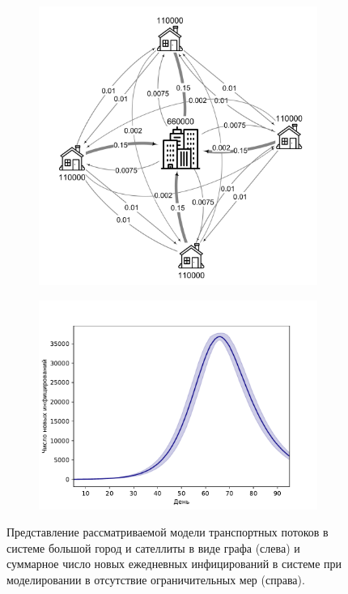 \documentclass[a4paper,12pt]{article} %
\begin{document}
\begin{figure}[H]
    \centering
    \begin{subfigure}{0.45\linewidth}
        \centering
        \includegraphics[width=\linewidth]{images/graph1.png}
    \end{subfigure}
    \hfill
    \begin{subfigure}{0.5\linewidth}
        \centering
        \includegraphics[width=\linewidth]{images/epid.pdf}
    \end{subfigure}
    \caption{Представление рассматриваемой модели транспортных потоков в системе большой город и сателлиты в виде графа (слева) и суммарное число новых ежедневных инфицирований в системе при моделировании в отсутствие ограничительных мер (справа).}
\end{figure}
\end{document}
